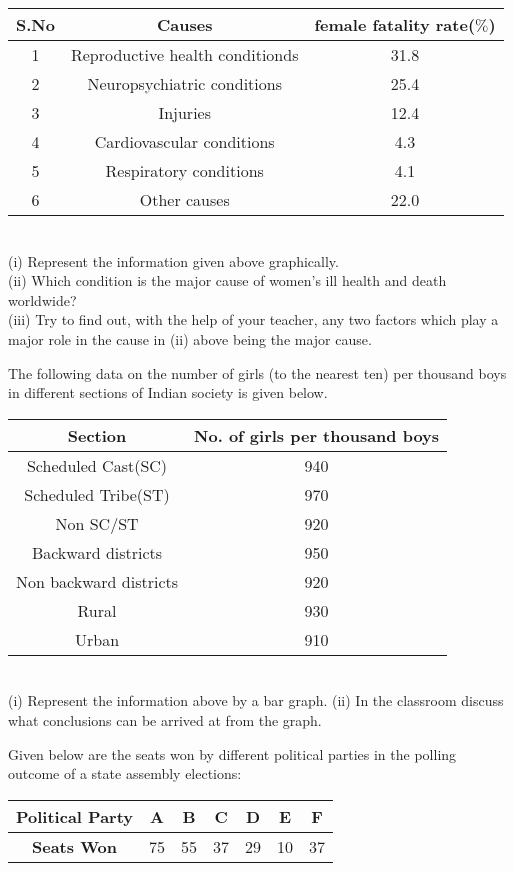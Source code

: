 \begin{tabular}{|c|c|c|}
\hline
\textbf{S.No} &\textbf{Causes} &\textbf{female fatality rate($\%$)}\\
\hline
1 &Reproductive health conditionds &31.8\\
2 &Neuropsychiatric conditions &25.4\\
3 &Injuries &12.4\\
4 &Cardiovascular conditions &4.3\\
5 &Respiratory conditions &4.1\\
6 &Other causes &22.0\\
\hline
\end{tabular}\\
(i) Represent the information given above graphically.\\
(ii) Which condition is the major cause of women’s ill health and death worldwide?\\
(iii) Try to find out, with the help of your teacher, any two factors which play a major role in the cause in (ii) above being the major cause.\\
  \item The following data on the number of girls (to the nearest ten) per thousand boys in different sections of Indian society is given below.\\
  \begin{tabular}{|c|c|}
\hline
\textbf{Section} &\textbf{No. of girls per thousand boys}\\
\hline
 Scheduled Cast(SC) &940\\
 Scheduled Tribe(ST) &970\\
 Non SC/ST &920\\
 Backward districts &950\\
 Non backward districts &920\\
 Rural &930\\
 Urban &910\\
\hline
\end{tabular}\\

(i) Represent the information above by a bar graph.
(ii) In the classroom discuss what conclusions can be arrived at from the graph.\\
\item Given below are the seats won by different political parties in the polling outcome of a state assembly elections:\\
 \begin{tabular}{|c|c|c|c|c|c|c|}
\hline
\textbf{Political Party} &A &B &C &D &E &F\\
\hline
\textbf{Seats Won} &75 &55 &37 &29 &10 &37\\
\hline
\end{tabular}\\


